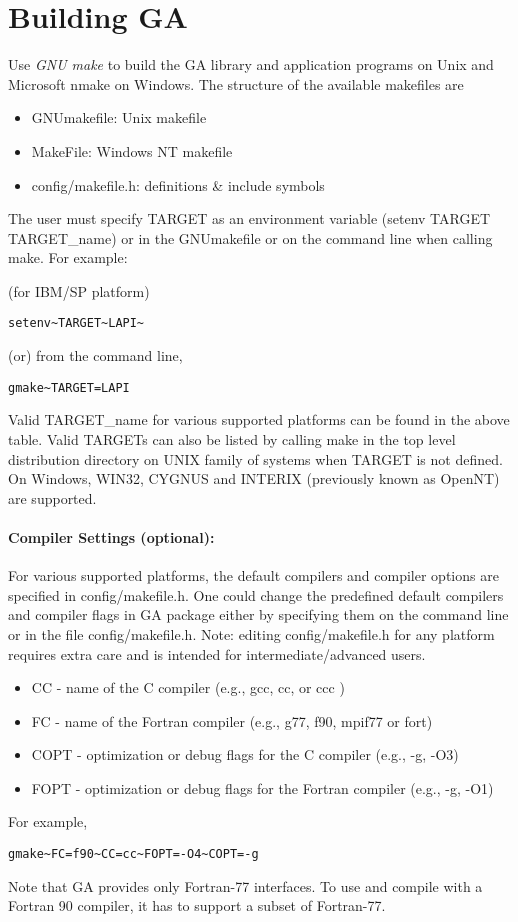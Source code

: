 \section{Building GA }

Use\emph{ GNU make} to build the GA library and application programs
on Unix and Microsoft nmake on Windows. The structure of the available
makefiles are
\begin{itemize}
\item GNUmakefile: Unix makefile 
\item MakeFile: Windows NT makefile 
\item config/makefile.h: definitions \& include symbols
\end{itemize}
The user must specify TARGET as an environment variable (setenv TARGET
TARGET\_name) or in the GNUmakefile or on the command line when calling
make. For example: 

(for IBM/SP platform)
\begin{verbatim}
setenv~TARGET~LAPI~
\end{verbatim}
(or) from the command line, 
\begin{verbatim}
gmake~TARGET=LAPI
\end{verbatim}
Valid TARGET\_name for various supported platforms can be found in
the above table. Valid TARGETs can also be listed by calling make
in the top level distribution directory on UNIX family of systems
when TARGET is not defined. On Windows, WIN32, CYGNUS and INTERIX
(previously known as OpenNT) are supported. 


\paragraph{Compiler Settings (optional): }

For various supported platforms, the default compilers and compiler
options are specified in config/makefile.h. One could change the predefined
default compilers and compiler flags in GA package either by specifying
them on the command line or in the file config/makefile.h. Note: editing
config/makefile.h for any platform requires extra care and is intended
for intermediate/advanced users.
\begin{itemize}
\item CC - name of the C compiler (e.g., gcc, cc, or ccc ) 
\item FC - name of the Fortran compiler (e.g., g77, f90, mpif77 or fort) 
\item COPT - optimization or debug flags for the C compiler (e.g., -g, -O3) 
\item FOPT - optimization or debug flags for the Fortran compiler (e.g.,
-g, -O1)
\end{itemize}
For example,
\begin{verbatim}
gmake~FC=f90~CC=cc~FOPT=-O4~COPT=-g
\end{verbatim}
Note that GA provides only Fortran-77 interfaces. To use and compile
with a Fortran 90 compiler, it has to support a subset of Fortran-77. 


